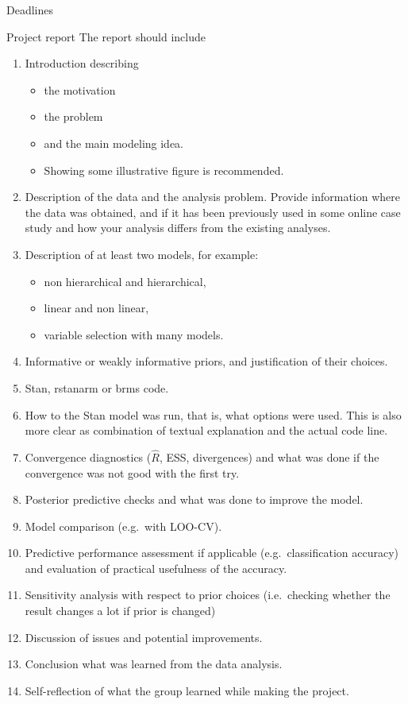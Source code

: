 \documentclass[
  13pt,
  ignorenonframetext,
]{beamer}
\providecommand{\tightlist}{%
  \setlength{\itemsep}{0pt}\setlength{\parskip}{0pt}}
\begin{document}
\begin{frame}[fragile]{Deadlines}
\begin{block}{Project report}
The report should include

\begin{enumerate}
\tightlist
\item
  Introduction describing

  \begin{itemize}
  \tightlist
  \item
    the motivation
  \item
    the problem
  \item
    and the main modeling idea.
  \item
    Showing some illustrative figure is recommended.
  \end{itemize}
\item
  Description of the data and the analysis problem. Provide information
  where the data was obtained, and if it has been previously used in
  some online case study and how your analysis differs from the existing
  analyses.
\item
  Description of at least two models, for example:

  \begin{itemize}
  \tightlist
  \item
    non hierarchical and hierarchical,
  \item
    linear and non linear,
  \item
    variable selection with many models.
  \end{itemize}
\item
  Informative or weakly informative priors, and justification of their
  choices.
\item
  Stan, rstanarm or brms code.
\item
  How to the Stan model was run, that is, what options were used. This
  is also more clear as combination of textual explanation and the
  actual code line.
\item
  Convergence diagnostics (\(\widehat{R}\), ESS, divergences) and what
  was done if the convergence was not good with the first try.
\item
  Posterior predictive checks and what was done to improve the model.
\item
  Model comparison (e.g.~with LOO-CV).
\item
  Predictive performance assessment if applicable (e.g.~classification
  accuracy) and evaluation of practical usefulness of the accuracy.
\item
  Sensitivity analysis with respect to prior choices (i.e.~checking
  whether the result changes a lot if prior is changed)
\item
  Discussion of issues and potential improvements.
\item
  Conclusion what was learned from the data analysis.
\item
  Self-reflection of what the group learned while making the project.
\end{enumerate}
\end{block}


\end{frame}
\end{document}
